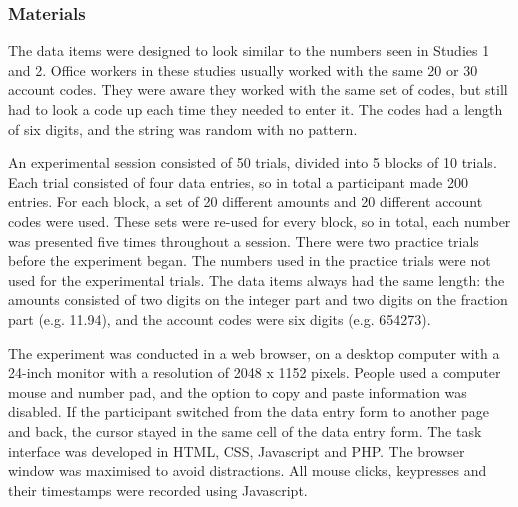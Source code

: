 \begin{table}
\begin{itemize}


\subsubsection{Materials}
The data items were designed to look similar to the numbers seen in Studies 1 and 2. Office workers in these studies usually worked with the same 20 or 30 account codes. They were aware they worked with the same set of codes, but still had to look a code up each time they needed to enter it. The codes had a length of six digits, and the string was random with no pattern. 

An experimental session consisted of 50 trials, divided into 5 blocks of 10 trials.  Each trial consisted of four data entries, so in total a participant made 200 entries. For each block, a set of 20 different amounts and 20 different account codes were used. These sets were re-used for every block, so in total, each number was presented five times throughout a session. There were two practice trials before the experiment began. The numbers used in the practice trials were not used for the experimental trials. The data items always had the same length: the amounts consisted of two digits on the integer part and two digits on the fraction part (e.g. 11.94), and the account codes were six digits (e.g. 654273).

The experiment was conducted in a web browser, on a desktop computer with a 24-inch monitor with a resolution of 2048 x 1152 pixels. People used a computer mouse and number pad, and the option to copy and paste information was disabled. If the participant switched from the data entry form to another page and back, the cursor stayed in the same cell of the data entry form. The task interface was developed in HTML, CSS, Javascript and PHP. The browser window was maximised to avoid distractions. All mouse clicks, keypresses and their timestamps were recorded using Javascript. 


\end{itemize}
\end{table}
